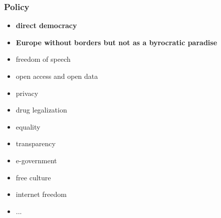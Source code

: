 \begin{frame}
	\frametitle{Policy}
	\begin{itemize}
		\item \textbf{direct democracy}
		\item \textbf{Europe without borders but not as a byrocratic paradise}
		\item freedom of speech
		\item open access and open data
		\item privacy
		\item drug legalization
		\item equality
		\item transparency
		\item e-government
		\item free culture
		\item internet freedom
		\item ...
	\end{itemize}
	
\end{frame}

